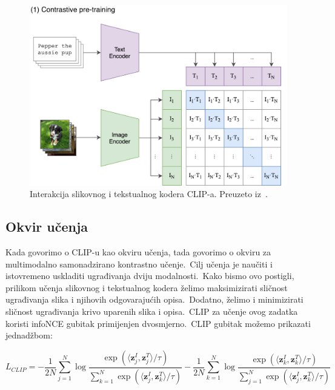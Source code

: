 \documentclass[times, utf8, seminar, numeric]{fer}
\begin{document}
\begin{figure}[h]
    \centering
    \includegraphics[scale=0.5]{./Slike/CLIP_arhitektura.png}
    \caption{Interakcija slikovnog i tekstualnog kodera CLIP-a. Preuzeto iz~\cite{radford2021learning}.}
    \label{fig:CLIP_architecture}
\end{figure}

\subsection{Okvir učenja}

Kada govorimo o CLIP-u kao okviru učenja, tada govorimo o okviru za multimodalno samonadzirano kontrastno učenje.\ Cilj učenja je naučiti i istovremeno uskladiti ugrađivanja dviju modalnosti.\ 
Kako bismo ovo postigli, prilikom učenja slikovnog i tekstualnog kodera želimo maksimizirati sličnost ugrađivanja slika i njihovih odgovarajućih opisa.\ Dodatno, želimo i minimizirati sličnost ugrađivanja krivo uparenih slika i opisa.\ 
CLIP za učenje ovog zadatka koristi infoNCE gubitak primijenjen dvosmjerno.\ CLIP gubitak možemo prikazati jednadžbom: 

\begin{equation}
    L_{CLIP} = - \frac{1}{2N} \sum_{j=1}^{N} \log{\frac{\exp(\langle \bm{z}_{j}^I, \bm{z}_{j}^T \rangle / \tau)}{\sum_{k=1}^{N}{\exp(\langle \bm{z}_{j}^I, \bm{z}_{k}^T \rangle / \tau)}}} - \frac{1}{2N} \sum_{k=1}^{N} \log{\frac{\exp(\langle \bm{z}_{k}^I, \bm{z}_{k}^T \rangle / \tau)}{\sum_{j=1}^{N}{\exp(\langle \bm{z}_{j}^I, \bm{z}_{k}^T \rangle / \tau)}}}
    \label{eq:CLIP_loss}
\end{equation}
\end{document}
